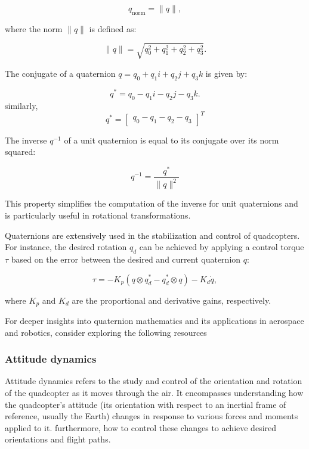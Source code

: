 \documentclass{article}
\begin{document}
\begin{equation}
q_{\text{norm}} = {\|q\|},
\end{equation}

where the norm \( \|q\| \) is defined as:

\begin{equation}
\|q\| = \sqrt{q_0^2 + q_1^2 + q_2^2 + q_3^2}.
\end{equation}

The conjugate of a quaternion \( q = q_0 + q_1i + q_2j + q_3k \) is given by:

\begin{equation}
q^* = q_0 - q_1i - q_2j - q_3k.
\end{equation}
similarly,
\begin{equation}
q^* = \begin{bmatrix} q_0 - q_1 - q_2 - q_3\end{bmatrix}^T
\end{equation}

The inverse \( q^{-1} \) of a unit quaternion is equal to its conjugate over its
norm squared:

\begin{equation}
q^{-1} = \frac{q^*}{\|q\| ^2}
\end{equation}

This property simplifies the computation of the inverse for unit quaternions and
is particularly useful in rotational transformations.

Quaternions are extensively used in the stabilization and control of
quadcopters. For instance, the desired rotation \( q_d \) can be achieved by
applying a control torque \( \tau \) based on the error between the desired and
current quaternion \( q \):

\begin{equation}
\tau = -K_p(q \otimes q_d^* - q_d^* \otimes q) - K_d\dot{q},
\end{equation}

where \( K_p \) and \( K_d \) are the proportional and derivative gains,
respectively.

For deeper insights into quaternion mathematics and its applications in
aerospace and robotics, consider exploring the following resources
\cite{Kuipers1999} \cite{quaternion_curves}
\cite{QuaternionBasedAttitudeControl}

\subsubsection{Attitude dynamics}
Attitude dynamics refers to the study and control of the orientation and
rotation of the quadcopter as it moves through the air. It encompasses
understanding how the quadcopter's attitude (its orientation with respect to an
inertial frame of reference, usually the Earth) changes in response to various
forces and moments applied to it. furthermore, how to control these changes to
achieve desired orientations and flight paths.
\end{document}
